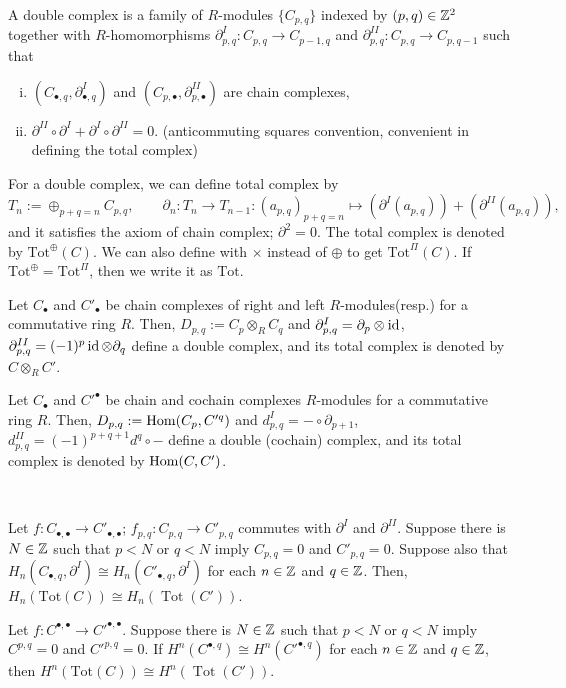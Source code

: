 \documentclass{../../../small}
\DeclareMathOperator{\Tot}{Tot}
\begin{document}
\begin{defn*}
A double complex is a family of $R$-modules $\{C_{p,q}\}$ indexed by $(p,q)\in\mathbb{Z}^2$ together with $R$-homomorphisms $\partial_{p,q}^I:C_{p,q}\to C_{p-1,q}$ and $\partial_{p,q}^{II}:C_{p,q}\to C_{p,q-1}$ such that
\begin{enumerate}[(i)]
\item  $(C_{\bullet,q},\partial_{\bullet,q}^I)$ and $(C_{p,\bullet},\partial_{p,\bullet}^{II})$ are chain complexes,
\item $\partial^{II}\circ\partial^I+\partial^I\circ\partial^{II}=0$. (anticommuting squares convention, convenient in defining the total complex)
\end{enumerate}
For a double complex, we can define total complex by
\[T_n:=\oplus_{p+q=n} C_{p,q},\qquad\partial_n:T_n\to T_{n-1}:(a_{p,q})_{p+q=n}\mapsto(\partial^I(a_{p,q}))+(\partial^{II}(a_{p,q})),\]
and it satisfies the axiom of chain complex; $\partial^2=0$.
The total complex is denoted by $\mathrm{Tot}^\oplus(C)$.
We can also define with $\times$ instead of $\oplus$ to get $\mathrm{Tot}^\Pi(C)$.
If $\mathrm{Tot}^\oplus=\mathrm{Tot}^\Pi$, then we write it as $\mathrm{Tot}$.
\end{defn*}
\begin{ex*}
Let $C_\bullet$ and $C'_\bullet$ be chain complexes of right and left $R$-modules(resp.) for a commutative ring $R$.
Then, $D_{p,q}:=C_p\otimes_RC_q$ and $\partial_{p,q}^I=\partial_p\otimes\operatorname{id}$, $\partial_{p,q}^{II}=(-1)^p\operatorname{id}\otimes\partial_q$ define a double complex, and its total complex is denoted by $C\otimes_RC'$.
\end{ex*}

\begin{ex*}
Let $C_\bullet$ and $C'^\bullet$ be chain and cochain complexes $R$-modules for a commutative ring $R$.
Then, $D_{p,q}:=\operatorname{Hom}(C_p,C'^q)$ and $d_{p,q}^I=-\circ\partial_{p+1}$, $d_{p,q}^{II}=(-1)^{p+q+1}d^q\circ-$ define a double (cochain) complex, and its total complex is denoted by $\operatorname{Hom}(C,C')$.
\end{ex*}

\begin{prop*}[2.3.1]\,
\begin{parts}
\item
Let $f:C_{\bullet,\bullet}\to C'_{\bullet,\bullet}$; $f_{p,q}:C_{p,q}\to C'_{p,q}$ commutes with $\partial^I$ and $\partial^{II}$.
Suppose there is $N\in\mathbb{Z}$ such that $p<N$ or $q<N$ imply $C_{p,q}=0$ and $C'_{p,q}=0$.
Suppose also that $H_n(C_{\bullet,q},\partial^I)\cong H_n(C'_{\bullet,q},\partial^I)$ for each $n\in\mathbb{Z}$ and $q\in\mathbb{Z}$.
Then, $H_n(\mathrm{Tot}(C))\cong H_n(\Tot(C'))$.

\item
Let $f:C^{\bullet,\bullet}\to C'^{\bullet,\bullet}$.
Suppose there is $N\in\mathbb{Z}$ such that $p<N$ or $q<N$ imply $C^{p,q}=0$ and $C'^{p,q}=0$.
If $H^n(C^{\bullet,q})\cong H^n(C'^{\bullet,q})$ for each $n\in\mathbb{Z}$ and $q\in\mathbb{Z}$, then $H^n(\mathrm{Tot}(C))\cong H^n(\Tot(C'))$.
\end{parts}
\end{prop*}
\end{document}
